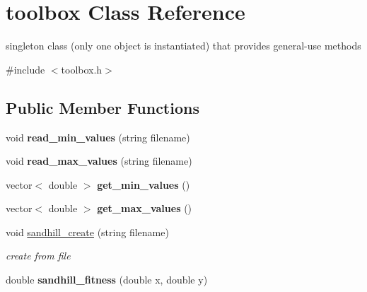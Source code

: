 \hypertarget{classtoolbox}{\section{toolbox Class Reference}
\label{classtoolbox}
}


singleton class (only one object is instantiated) that provides general-\/use methods  




{\ttfamily \#include $<$toolbox.\+h$>$}

\subsection*{Public Member Functions}
\begin{DoxyCompactItemize}
\item 
\hypertarget{classtoolbox_aeccc47e3554b49d0077cd6a1967bf8e8}{void {\bfseries read\+\_\+min\+\_\+values} (string filename)}\label{classtoolbox_aeccc47e3554b49d0077cd6a1967bf8e8}

\item 
\hypertarget{classtoolbox_a70936376f353e24a4a9c98d77d8618b5}{void {\bfseries read\+\_\+max\+\_\+values} (string filename)}\label{classtoolbox_a70936376f353e24a4a9c98d77d8618b5}

\item 
\hypertarget{classtoolbox_ae211afebb8cbf64ad2782cfed4cf80dc}{vector$<$ double $>$ {\bfseries get\+\_\+min\+\_\+values} ()}\label{classtoolbox_ae211afebb8cbf64ad2782cfed4cf80dc}

\item 
\hypertarget{classtoolbox_a00d9224a5611a483523740ff63c88775}{vector$<$ double $>$ {\bfseries get\+\_\+max\+\_\+values} ()}\label{classtoolbox_a00d9224a5611a483523740ff63c88775}

\item 
\hypertarget{classtoolbox_ab447abb1ad0631aa7f9165e447d4b1db}{void \hyperlink{classtoolbox_ab447abb1ad0631aa7f9165e447d4b1db}{sandhill\+\_\+create} (string filename)}\label{classtoolbox_ab447abb1ad0631aa7f9165e447d4b1db}

\begin{DoxyCompactList}\small\item\em create from file \end{DoxyCompactList}\item 
\hypertarget{classtoolbox_a153ecab8241cbbb42d32931d580191c4}{double {\bfseries sandhill\+\_\+fitness} (double x, double y)}\label{classtoolbox_a153ecab8241cbbb42d32931d580191c4}


\end{DoxyCompactItemize}
